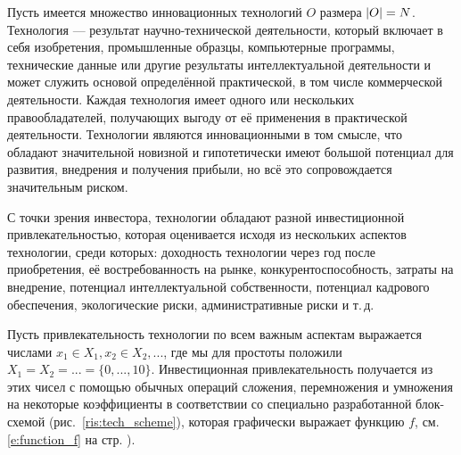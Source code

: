 
Пусть имеется множество инновационных технологий $O$ размера $\left| O \right| = N$.  Технология --- результат научно-технической деятельности, который включает в себя изобретения, промышленные образцы, компьютерные программы, технические данные или другие результаты интеллектуальной деятельности и может служить основой определённой практической, в том числе коммерческой деятельности. Каждая технология имеет одного или нескольких правообладателей, получающих выгоду от её применения в практической деятельности. Технологии являются инновационными в том смысле, что обладают значительной новизной и гипотетически имеют большой потенциал для развития, внедрения и получения прибыли, но всё это сопровождается значительным риском. 


С точки зрения инвестора, технологии обладают разной инвестиционной привлекательностью, которая оценивается исходя из нескольких аспектов технологии, среди которых: доходность технологии через год после приобретения, её востребованность на рынке, конкурентоспособность, затраты на внедрение, потенциал интеллектуальной собственности, потенциал кадрового обеспечения, экологические риски, административные риски и т.\,д. 

Пусть привлекательность технологии по всем важным аспектам выражается числами $x_1 \in X_1, x_2 \in X_2, ...$, где мы для простоты положили $X_1 = X_2 = ... = \{0, ..., 10\}$. Инвестиционная привлекательность получается из этих чисел с помощью обычных операций сложения, перемножения и умножения на некоторые коэффициенты в соответствии со специально разработанной блок-схемой (рис.~\ref{ris:tech_scheme}), которая графически выражает функцию $f$, см. \eqref{e:function_f} на стр. \pageref{e:function_f}). 

